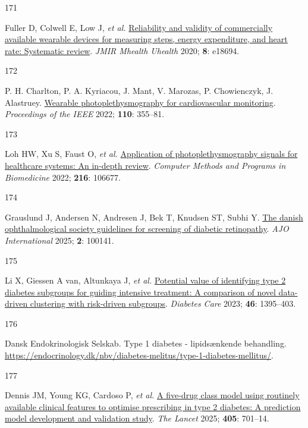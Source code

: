 \documentclass[
  a4paper,
  headsepline=true,
  open=left]{scrbook}
\newlength{\cslhangindent}
\newlength{\csllabelwidth}
\newlength{\cslentryspacingunit} %
\newenvironment{CSLReferences}[2] %
 {%
  \setlength{\parindent}{0pt}
  \ifodd #1
  \let\oldpar\par
  \def\par{\hangindent=\cslhangindent\oldpar}
  \fi
  \setlength{\parskip}{#2\cslentryspacingunit}
 }%
 {}
\newcommand{\CSLLeftMargin}[1]{\parbox[t]{\csllabelwidth}{#1}}
\newcommand{\CSLRightInline}[1]{\parbox[t]{\linewidth - \csllabelwidth}{#1}\break}
\begin{document}
\begin{CSLReferences}{0}{0}
\leavevmode{}%
\CSLLeftMargin{171 }%
\CSLRightInline{Fuller D, Colwell E, Low J, \emph{et al.}
\href{https://doi.org/10.2196/18694}{Reliability and validity of
commercially available wearable devices for measuring steps, energy
expenditure, and heart rate: Systematic review}. \emph{JMIR Mhealth
Uhealth} 2020; \textbf{8}: e18694.}

\leavevmode{}%
\CSLLeftMargin{172 }%
\CSLRightInline{P. H. Charlton, P. A. Kyriacou, J. Mant, V. Marozas, P.
Chowienczyk, J. Alastruey.
\href{https://doi.org/10.1109/JPROC.2022.3149785}{Wearable
photoplethysmography for cardiovascular monitoring}. \emph{Proceedings
of the IEEE} 2022; \textbf{110}: 355--81.}

\leavevmode{}%
\CSLLeftMargin{173 }%
\CSLRightInline{Loh HW, Xu S, Faust O, \emph{et al.}
\href{https://doi.org/10.1016/j.cmpb.2022.106677}{Application of
photoplethysmography signals for healthcare systems: An in-depth
review}. \emph{Computer Methods and Programs in Biomedicine} 2022;
\textbf{216}: 106677.}

\leavevmode{}%
\CSLLeftMargin{174 }%
\CSLRightInline{Grauslund J, Andersen N, Andresen J, Bek T, Knudsen ST,
Subhi Y. \href{https://doi.org/10.1016/j.ajoint.2025.100141}{The danish
ophthalmological society guidelines for screening of diabetic
retinopathy}. \emph{AJO International} 2025; \textbf{2}: 100141.}

\leavevmode{}%
\CSLLeftMargin{175 }%
\CSLRightInline{Li X, Giessen A van, Altunkaya J, \emph{et al.}
\href{https://doi.org/10.2337/dc22-2170}{Potential value of identifying
type 2 diabetes subgroups for guiding intensive treatment: A comparison
of novel data-driven clustering with risk-driven subgroups}.
\emph{Diabetes Care} 2023; \textbf{46}: 1395--403.}

\leavevmode{}%
\CSLLeftMargin{176 }%
\CSLRightInline{Dansk Endokrinologisk Selskab. Type 1 diabetes -
lipidsænkende behandling.
\url{https://endocrinology.dk/nbv/diabetes-melitus/type-1-diabetes-mellitus/}.}

\leavevmode{}%
\CSLLeftMargin{177 }%
\CSLRightInline{Dennis JM, Young KG, Cardoso P, \emph{et al.}
\href{https://doi.org/10.1016/S0140-6736(24)02617-5}{A five-drug class
model using routinely available clinical features to optimise
prescribing in type 2 diabetes: A prediction model development and
validation study}. \emph{The Lancet} 2025; \textbf{405}: 701--14.}


\end{CSLReferences}
\end{document}
